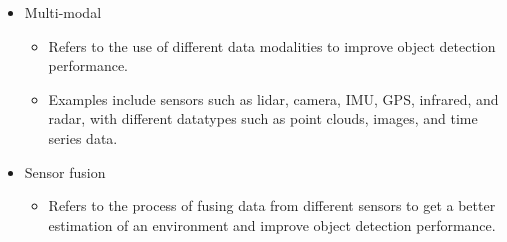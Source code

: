 \documentclass[rnd]{mas_proposal}
\begin{document}
\begin{itemize}
\begin{itemize}
\begin{itemize}
                \end{itemize}
            \item Multi-modal
                \begin{itemize}
                    \item Refers to the use of different data modalities to improve object detection performance.
                    \item Examples include sensors such as lidar, camera, IMU, GPS, infrared, and radar, with different datatypes such as point clouds, images, and time series data.
                \end{itemize}
            \item Sensor fusion
                \begin{itemize}
                    \item Refers to the process of fusing data from different sensors to get a better estimation of an environment and improve object detection performance.
                \end{itemize}
        \end{itemize}

        
        
        

\end{itemize}
\end{document}
